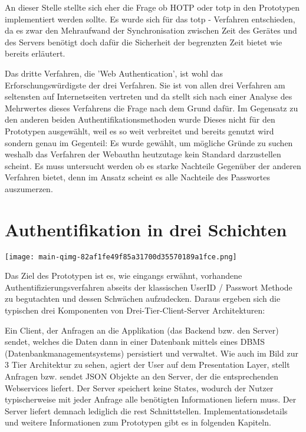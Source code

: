 An dieser Stelle stellte sich eher die Frage ob HOTP oder \ac{totp} in den Prototypen implementiert werden sollte. Es wurde sich für das \ac{totp} - Verfahren entschieden, da es zwar den Mehraufwand der Synchronisation zwischen Zeit des Gerätes und des Servers benötigt doch dafür die Sicherheit der begrenzten Zeit bietet wie bereits erläutert.

Das dritte Verfahren, die 'Web Authentication', ist wohl das Erforschungswürdigste der drei Verfahren. Sie ist von allen drei Verfahren am seltensten auf Internetseiten vertreten und da stellt sich nach einer Analyse des Mehrwertes dieses Verfahrens die Frage nach dem Grund dafür. Im Gegensatz zu den anderen beiden Authentifikationsmethoden wurde Dieses nicht für den Prototypen ausgewählt, weil es so weit verbreitet und bereits genutzt wird sondern genau im Gegenteil: Es wurde gewählt, um mögliche Gründe zu suchen weshalb das Verfahren der Webauthn heutzutage kein Standard darzustellen scheint. Es muss untersucht werden ob es starke Nachteile Gegenüber der anderen Verfahren bietet, denn im Ansatz scheint es alle Nachteile des Passwortes auszumerzen.
\newpage

\section{Authentifikation in drei Schichten}

\begin{center}
    \center
    \texttt{[image: main-qimg-82af1fe49f85a31700d35570189a1fce.png]}
\end{center} 

Das Ziel des Prototypen ist es, wie eingangs erwähnt, vorhandene Authentifizierungsverfahren abseits der klassischen UserID / Passwort Methode zu begutachten und dessen Schwächen aufzudecken. Daraus ergeben sich die typischen drei Komponenten von Drei-Tier-Client-Server Architekturen:

Ein Client, der Anfragen an die Applikation (das Backend bzw. den Server) sendet, welches die Daten dann in einer Datenbank mittels eines DBMS (Datenbankmanagementsystems) persistiert und verwaltet. Wie auch im Bild zur 3 Tier Architektur zu sehen, agiert der User auf dem Presentation Layer, stellt Anfragen bzw. sendet JSON Objekte an den Server, der die entsprechenden Webservices liefert. Der Server speichert keine States, wodurch der Nutzer typischerweise mit jeder Anfrage alle benötigten Informationen liefern muss. Der Server liefert demnach lediglich die \ac{rest} Schnittstellen. Implementationsdetails und weitere Informationen zum Prototypen gibt es in folgenden Kapiteln.

